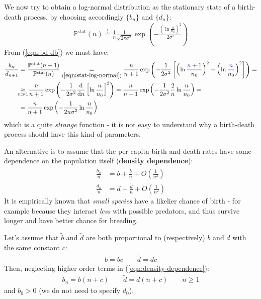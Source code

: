 \documentclass[../../main.tex]{subfiles}
\begin{document}
We now try to obtain a log-normal distribution as the stationary state of a birth-death process, by choosing accordingly $\{b_n\}$ and $\{d_n\}$:
\begin{align}\label{eqn:stat-log-normal}
    \mathbb{P}^{\mathrm{stat}}(n) \overset{!}{=} \frac{1}{n} \frac{1}{\sqrt{2 \pi \sigma^2}} \exp\left(-\frac{\left(\ln \frac{n}{n_0} \right)^2}{2 \sigma^2} \right) 
\end{align}
From (\ref{eqn:bd-db}) we must have:
\begin{align*}
    \frac{b_n}{d_{n+1}} &= \frac{\mathbb{P}^{\mathrm{stat}}(n+1)}{\mathbb{P}^{\mathrm{stat}}(n)} \underset{(\ref{eqn:stat-log-normal})}{=}  \frac{n}{n+1} \exp\left(-\frac{1}{2 \sigma^2} \left[\left(\ln \frac{\textcolor{Blue}{n+1}}{n_0} \right)^2 - \left(\ln \frac{\textcolor{Blue}{n}}{n_0} \right)^2\right]\right) =\\
    &\underset{\mathclap{n \gg 1}}{\approx}\>  \frac{n}{n+1} \exp\left(-\frac{1}{2 \sigma^2} \dv{n} \left[\ln \frac{n}{n_0} \right]^2 \right) = \frac{n}{n+1}\exp\left(-\frac{1}{2 \sigma^2} \frac{2}{n}\ln \frac{n}{n_0}   \right) =\\
    &= \frac{n}{n+1} \exp\left(-\frac{1}{2 n \sigma^2} \ln \frac{n}{n_0}  \right) 
\end{align*}
which is a quite \textit{strange} function - it is not easy to understand why a birth-death process should have this kind of parameters.

\medskip

An alternative is to assume that the per-capita birth and death rates have some dependence on the population itself (\textbf{density dependence}):
\begin{align}\label{eqn:density-dependence}
    \frac{b_n}{n} &= b + \frac{\tilde{b}}{n} + O\left(\frac{1}{n^2} \right)  \\ \nonumber
    \frac{d_n}{n} &= d + \frac{\tilde{d}}{n} + O\left(\frac{1}{n^2} \right)  
\end{align}
It is empirically known that \textit{small species} have a likelier chance of birth - for example because they interact \textit{less} with possible predators, and thus survive longer and have better chance for breeding.

\medskip

Let's assume that $\tilde{b}$ and $\tilde{d}$ are both proportional to (respectively) $b$ and $d$ with the same constant $c$:
\begin{align*}
    \tilde{b} = b c \qquad \tilde{d} = dc
\end{align*}
Then, neglecting higher order terms in (\ref{eqn:density-dependence}):
\begin{align*}
    b_n = b (n + c) \qquad \tilde{d} = d(n+c) \qquad n\geq 1
\end{align*}
and $b_0 > 0$ (we do not need to specify $d_0$). 
\end{document}
